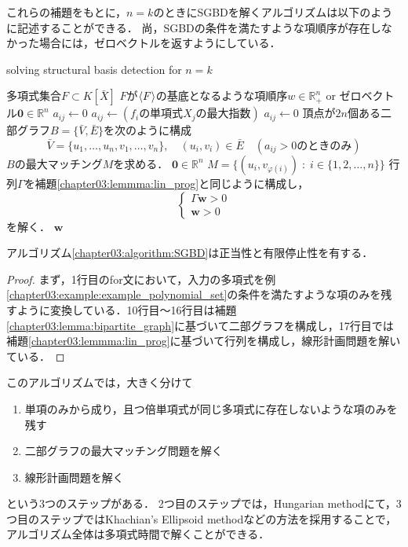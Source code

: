 これらの補題をもとに，$n=k$のときにSGBDを解くアルゴリズムは以下のように記述することができる．
尚，SGBDの条件を満たすような項順序が存在しなかった場合には，ゼロベクトルを返すようにしている．
\begin{algorithm}[htbp]
	\label{chapter03:algorithm:SGBD}
	\caption{solving structural \groebner{} basis detection for $n = k$ {\cite[Algorighm7]{sturmfels1997structural}}}
	\begin{algorithmic}[1]
		\Require 多項式集合$F \subset K[\bar{X}]$
		\Ensure $F$が$\langle F \rangle$の\groebner{}基底となるような項順序$w \in \mathbb{R}_{+}^n$ or ゼロベクトル$\bm{0} \in \mathbb{R}^n$
				\State $a_{ij} \gets 0$
			\EndIf
			\State $a_{ij} \gets (f_i\text{の単項式}X_j\text{の最大指数})$
				\State $a_{ij} \gets 0$
			\EndIf
		\EndFor
		\State 頂点が$2n$個ある二部グラフ$B = \{\bar{V}, \bar{E}\}$を次のように構成
		$$\bar{V} = \{u_1, \dots, u_n, v_1, \dots, v_n\}, \quad (u_i, v_i) \in \bar{E} \quad(a_{ij} > 0 \text{のときのみ})$$
		\State $B$の最大マッチング$M$を求める．
			\State \Return $\bm{0} \in \mathbb{R}^n$
		\Else 
			\State $M = \{(u_i, v_{\varphi(i)})\;:\; i \in \{1, 2, \dots, n\}\}$
		\EndIf
		\State 行列$\varGamma$を補題\ref{chapter03:lemmma:lin_prog}と同じように構成し，
		$$\begin{cases}
			\varGamma \bm{w} > 0\\
			\bm{w} > 0
		\end{cases}$$
		を解く．
		\State \Return $\bm{w}$
	\end{algorithmic}
\end{algorithm}

\begin{theorem}
	アルゴリズム\ref{chapter03:algorithm:SGBD}は正当性と有限停止性を有する．
\end{theorem}
\begin{proof}
	まず，1行目のfor文において，入力の多項式を例\ref{chapter03:example:example_polynomial_set}の条件を満たすような項のみを残すように変換している．10行目〜16行目は補題\ref{chapter03:lemma:bipartite_graph}に基づいて二部グラフを構成し，17行目では補題\ref{chapter03:lemmma:lin_prog}に基づいて行列を構成し，線形計画問題を解いている．
\end{proof}
このアルゴリズムでは，大きく分けて
\begin{enumerate}
	\item 単項のみから成り，且つ倍単項式が同じ多項式に存在しないような項のみを残す
	\item 二部グラフの最大マッチング問題を解く
	\item 線形計画問題を解く
\end{enumerate}
という$3$つのステップがある．
2つ目のステップでは，Hungarian method\cite{plummer1986matching}にて，3つ目のステップではKhachian's Ellipsoid method\cite{schrijver1998theory}などの方法を採用することで，アルゴリズム全体は多項式時間で解くことができる\cite{sturmfels1997structural}．

